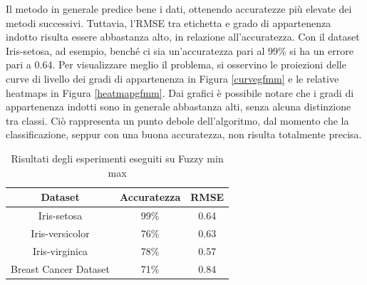 \documentclass[11pt,  oneside, openany]{book}
\begin{document}
Il metodo in generale predice bene i dati, ottenendo accuratezze più elevate dei metodi successivi. Tuttavia, l'RMSE tra etichetta e grado di appartenenza indotto risulta essere abbastanza alto, in relazione all'accuratezza. Con il dataset Iris-setosa, ad esempio, benché ci sia un'accuratezza pari al 99\% si ha un errore pari a 0.64. Per visualizzare meglio il problema, si osservino le proiezioni delle curve di livello dei gradi di appartenenza in Figura \ref{curvegfmm} e le relative heatmaps in Figura \ref{heatmapgfmm}. 
Dai grafici è possibile notare che i gradi di appartenenza indotti sono in generale abbastanza alti, senza alcuna distinzione tra classi. Ciò rappresenta un punto debole dell'algoritmo, dal momento che la classificazione, seppur con una buona accuratezza, non risulta totalmente precisa. 

\begin{table} [h!]
      \begin{center}\begin{tabular}{ |c|c|c| } 
        \hline
        Dataset & Accuratezza & RMSE\\
        \hline
        Iris-setosa & 99\% & 0.64 \\
        \hline
        Iris-versicolor & 76\% & 0.63 \\
        \hline
        Iris-virginica & 78\% & 0.57 \\
        \hline
        Breast Cancer Dataset & 71\%  & 0.84 \\
        \hline                  
      \end{tabular}
    \end{center}
    \caption{Risultati degli esperimenti eseguiti su Fuzzy min max}
    \label{tab:fmm}  
    \end{table}
\end{document}
